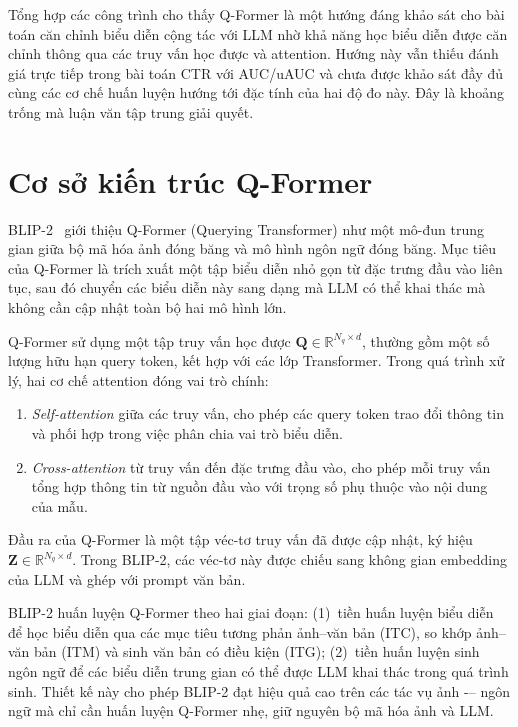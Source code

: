 Tổng hợp các công trình cho thấy Q-Former là một hướng đáng khảo sát cho bài toán căn chỉnh
biểu diễn cộng tác với LLM nhờ khả năng học biểu diễn được căn chỉnh thông qua các truy vấn học được và attention.
Hướng này vẫn thiếu đánh giá trực tiếp trong bài toán CTR với AUC/uAUC và chưa
được khảo sát đầy đủ cùng các cơ chế huấn luyện hướng tới đặc tính của hai độ đo này. Đây là
khoảng trống mà luận văn tập trung giải quyết.

\section{Cơ sở kiến trúc Q-Former}
\label{sec:nen-tang-qformer}

BLIP-2~\cite{blip2_2023} giới thiệu Q-Former (Querying Transformer) như một mô-đun trung
gian giữa bộ mã hóa ảnh đóng băng và mô hình ngôn ngữ đóng băng. Mục tiêu của Q-Former
là trích xuất một tập biểu diễn nhỏ gọn từ đặc trưng đầu vào liên tục, sau đó chuyển các biểu
diễn này sang dạng mà LLM có thể khai thác mà không cần cập nhật toàn bộ hai mô hình lớn.

Q-Former sử dụng một tập truy vấn học được $\mathbf{Q} \in \mathbb{R}^{N_q \times d}$, thường
gồm một số lượng hữu hạn query token, kết hợp với các lớp Transformer. Trong quá trình xử lý,
hai cơ chế attention đóng vai trò chính:

\begin{enumerate}
    \item \textit{Self-attention} giữa các truy vấn, cho phép các query token trao đổi thông tin và
    phối hợp trong việc phân chia vai trò biểu diễn.
    \item \textit{Cross-attention} từ truy vấn đến đặc trưng đầu vào, cho phép mỗi truy vấn tổng
    hợp thông tin từ nguồn đầu vào với trọng số phụ thuộc vào nội dung của mẫu.
\end{enumerate}

Đầu ra của Q-Former là một tập véc-tơ truy vấn đã được cập nhật, ký hiệu $\mathbf{Z} \in
\mathbb{R}^{N_q \times d}$. Trong BLIP-2, các véc-tơ này được chiếu sang không gian
embedding của LLM và ghép với prompt văn bản.

BLIP-2 huấn luyện Q-Former theo hai giai đoạn: (1)~tiền huấn luyện biểu diễn để học biểu diễn qua các
mục tiêu tương phản ảnh--văn bản (ITC), so khớp ảnh--văn bản (ITM) và sinh văn bản có điều
kiện (ITG); (2)~tiền huấn luyện sinh ngôn ngữ để các biểu diễn trung gian có thể được LLM khai thác trong quá trình sinh.
Thiết kế này cho phép BLIP-2 đạt hiệu quả cao trên các tác vụ ảnh -– ngôn
ngữ mà chỉ cần huấn luyện Q-Former nhẹ, giữ nguyên bộ mã hóa ảnh và LLM.

